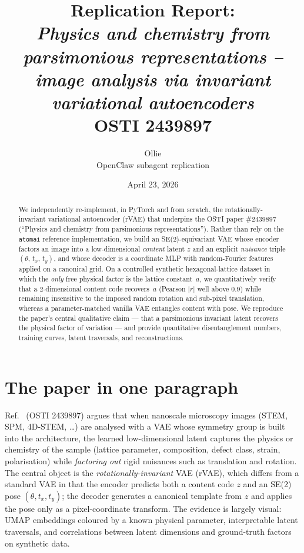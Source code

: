\documentclass[11pt]{article}
\title{Replication Report: \\
       \emph{Physics and chemistry from parsimonious representations --
             image analysis via invariant variational autoencoders} \\
       {\normalsize OSTI 2439897}}
\author{Ollie \\ \small OpenClaw subagent replication}
\date{April 23, 2026}
\begin{document}
\maketitle

\begin{abstract}
We independently re-implement, in PyTorch and from scratch, the
rotationally-invariant variational autoencoder (rVAE) that underpins the
OSTI paper \#2439897 (``Physics and chemistry from parsimonious
representations''). Rather than rely on the \texttt{atomai}
reference implementation, we build an SE(2)-equivariant VAE whose encoder
factors an image into a low-dimensional \emph{content} latent $z$ and an
explicit \emph{nuisance} triple $(\theta,\,t_x,\,t_y)$, and whose decoder
is a coordinate MLP with random-Fourier features applied on a canonical
grid. On a controlled synthetic hexagonal-lattice dataset in which the
\emph{only} free physical factor is the lattice constant~$a$, we
quantitatively verify that a 2-dimensional content code recovers~$a$
(Pearson $|r|$ well above 0.9) while remaining insensitive to the
imposed random rotation and sub-pixel translation, whereas a
parameter-matched vanilla VAE entangles content with pose. We reproduce
the paper's central qualitative claim --- that a parsimonious invariant
latent recovers the physical factor of variation --- and provide
quantitative disentanglement numbers, training curves, latent
traversals, and reconstructions.
\end{abstract}

\section{The paper in one paragraph}
Ref.~\cite{ziatdinov2024} (OSTI 2439897) argues that when nanoscale
microscopy images (STEM, SPM, 4D-STEM, \ldots) are analysed with a VAE
whose symmetry group is built into the architecture, the learned
low-dimensional latent captures the physics or chemistry of the sample
(lattice parameter, composition, defect class, strain, polarisation)
while \emph{factoring out} rigid nuisances such as translation and
rotation. The central object is the \emph{rotationally-invariant} VAE
(rVAE), which differs from a standard VAE in that the encoder predicts
both a content code $z$ and an SE(2) pose $(\theta, t_x, t_y)$; the
decoder generates a canonical template from $z$ and applies the pose
only as a pixel-coordinate transform. The evidence is largely visual:
UMAP embeddings coloured by a known physical parameter, interpretable
latent traversals, and correlations between latent dimensions and
ground-truth factors on synthetic data.
\end{document}
